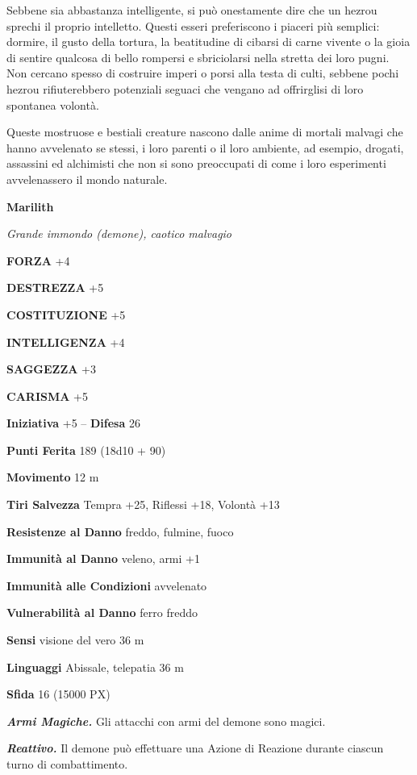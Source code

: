 \begin{multicols}{2}
Sebbene sia abbastanza intelligente, si può onestamente dire che un hezrou sprechi il proprio intelletto. Questi esseri preferiscono i piaceri più semplici: dormire, il gusto della tortura, la beatitudine di cibarsi di carne vivente o la gioia di sentire qualcosa di bello rompersi e sbriciolarsi nella stretta dei loro pugni. Non cercano spesso di costruire imperi o porsi alla testa di culti, sebbene pochi hezrou rifiuterebbero potenziali seguaci che vengano ad offrirglisi di loro spontanea volontà.

Queste mostruose e bestiali creature nascono dalle anime di mortali malvagi che hanno avvelenato se stessi, i loro parenti o il loro ambiente, ad esempio, drogati, assassini ed alchimisti che non si sono preoccupati di come i loro esperimenti avvelenassero il mondo naturale.

\medskip{}\textbf{Marilith}

\textit{Grande immondo (demone), caotico malvagio}

\textbf{FORZA} +4

\textbf{DESTREZZA} +5

\textbf{COSTITUZIONE} +5

\textbf{INTELLIGENZA} +4

\textbf{SAGGEZZA} +3

\textbf{CARISMA} +5

\textbf{Iniziativa} +5 -- \textbf{Difesa} 26

\textbf{Punti Ferita} 189 (18d10 + 90)

\textbf{Movimento} 12 m

\textbf{Tiri Salvezza} Tempra +25, Riflessi +18, Volontà +13

\textbf{Resistenze al Danno} freddo, fulmine, fuoco

\textbf{Immunità al Danno} veleno, armi +1

\textbf{Immunità alle Condizioni} avvelenato

\textbf{Vulnerabilità al Danno} ferro freddo

\textbf{Sensi} visione del vero 36 m

\textbf{Linguaggi} Abissale, telepatia 36 m

\textbf{Sfida} 16 (15000 PX)

\textit{\textbf{Armi Magiche.}} Gli attacchi con armi del demone sono magici.

\textit{\textbf{Reattivo.}} Il demone può effettuare una Azione di Reazione durante ciascun turno di combattimento.


\end{multicols}
